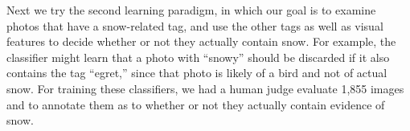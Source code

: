 














Next we try the second learning paradigm, in which our 
goal is to examine 
photos that have a snow-related tag, and use the other tags as well as visual features to decide
whether or not they actually contain snow. For example, the classifier
might learn that a photo with ``snowy'' should be discarded if it also
contains the tag ``egret,'' since that photo is likely of a bird and
not of actual snow.  
For training these classifiers, we had a human judge evaluate 1,855 images 
and to annotate them as to whether or not they actually contain evidence of snow.

